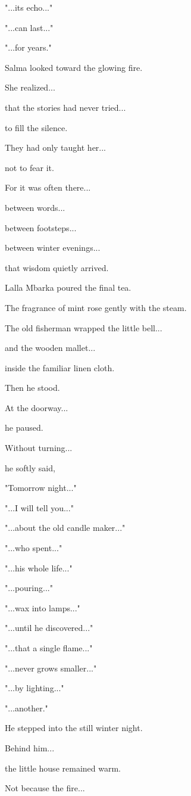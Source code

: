 \documentclass[12pt,openany]{book}
\begin{document}
"...its echo..."

"...can last..."

"...for years."

Salma looked toward the glowing fire.

She realized...

that the stories had never tried...

to fill the silence.

They had only taught her...

not to fear it.

For it was often there...

between words...

between footsteps...

between winter evenings...

that wisdom quietly arrived.

Lalla Mbarka poured the final tea.

The fragrance of mint rose gently with the steam.

The old fisherman wrapped the little bell...

and the wooden mallet...

inside the familiar linen cloth.

Then he stood.

At the doorway...

he paused.

Without turning...

he softly said,

"Tomorrow night..."

"...I will tell you..."

"...about the old candle maker..."

"...who spent..."

"...his whole life..."

"...pouring..."

"...wax into lamps..."

"...until he discovered..."

"...that a single flame..."

"...never grows smaller..."

"...by lighting..."

"...another."

He stepped into the still winter night.

Behind him...

the little house remained warm.

Not because the fire...
\end{document}
